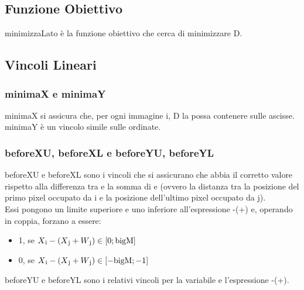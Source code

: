 

\subsection{Funzione Obiettivo}
\iffalse
\begin{math}
 minimize D
\end{math}
\fi

minimizzaLato è la funzione obiettivo che cerca di minimizzare D.




\subsection{Vincoli Lineari}

\subsubsection{minimaX e minimaY}
minimaX si assicura che, per ogni immagine i, D la possa contenere sulle ascisse. \\
minimaY è un vincolo simile sulle ordinate.





\newcommand{\Cij}{C\textsubscript{i,j}}

\subsubsection{beforeXU, beforeXL e beforeYU, beforeYL}
beforeXU e beforeXL sono i vincoli che si assicurano che \beforeXij{} abbia il corretto valore rispetto alla differenza tra \Xi{} e la somma di \Xj{} e \Wj{} (ovvero la distanza tra la posizione del primo pixel occupato da i e la posizione dell'ultimo pixel occupato da j). \\
Essi pongono un limite superiore e uno inferiore all'espressione \Xi{}-(\Xj{}+\Wj{}) e, operando in coppia, forzano \beforeXij{} a essere:
\begin{itemize}
	\itemsep0em
	\item 1, se $X\textsubscript{i}{}-(X\textsubscript{j}{}+W\textsubscript{j}{}) \in [0;\text{bigM}]$
	\item 0, se $X\textsubscript{i}{}-(X\textsubscript{j}{}+W\textsubscript{j}{}) \in [-\text{bigM};-1]$
\end{itemize}
%
%
\iffalse
/*
Cx variabile d'aiuto per befX; dicono quanto spazio c'è a “sinistra” tra l'inizio di i e la fine di j
* >= 0 intersezione non possibile, 
* <0 intersezione possibile
Cy simile per befY
*/
\fi
beforeYU e beforeYL sono i relativi vincoli per la variabile \beforeYij{} e l'espressione \Yi{}-(\Yj{}+\Hj{}).


